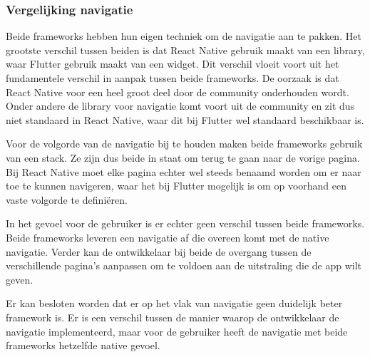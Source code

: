 \subsubsection{Vergelijking navigatie}
\label{subsubsec:vglNavigatie}

Beide frameworks hebben hun eigen techniek om de navigatie aan te pakken. Het grootste verschil tussen beiden is dat React Native gebruik maakt van een library, waar Flutter gebruik maakt van een widget. Dit verschil vloeit voort uit het fundamentele verschil in aanpak tussen beide frameworks. De oorzaak is dat React Native voor een heel groot deel door de community onderhouden wordt. Onder andere de library voor navigatie komt voort uit de community en zit dus niet standaard in React Native, waar dit bij Flutter wel standaard beschikbaar is.

Voor de volgorde van de navigatie bij te houden maken beide frameworks gebruik van een stack. Ze zijn dus beide in staat om terug te gaan naar de vorige pagina. Bij React Native moet elke pagina echter wel steeds benaamd worden om er naar toe te kunnen navigeren, waar het bij Flutter mogelijk is om op voorhand een vaste volgorde te definiëren.

In het gevoel voor de gebruiker is er echter geen verschil tussen beide frameworks. Beide frameworks leveren een navigatie af die overeen komt met de native navigatie. Verder kan de ontwikkelaar bij beide de overgang tussen de verschillende pagina's aanpassen om te voldoen aan de uitstraling die de app wilt geven. 

Er kan besloten worden dat er op het vlak van navigatie geen duidelijk beter framework is. Er is een verschil tussen de manier waarop de ontwikkelaar de navigatie implementeerd, maar voor de gebruiker heeft de navigatie met beide frameworks hetzelfde native gevoel.



